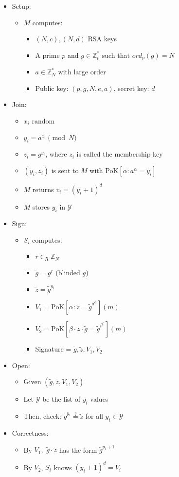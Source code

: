 \documentclass[11pt]{article}
\theoremstyle{definition}
\begin{document}
\begin{itemize}
	\item Setup:
	\begin{itemize}
		\item $M$ computes:
		\begin{itemize}
			\item $(N, c), (N, d)$ RSA keys
			\item A prime $p$ and $g \in \mathbb{Z}_p^*$ such that $ord_p(g) = N$
			\item $a \in \mathbb{Z}_N^*$ with large order
			\item Public key: $(p, g, N, e, a)$, secret key: $d$
		\end{itemize}
	\end{itemize}
	\item Join:
	\begin{itemize}
		\item $x_i$ random
		\item $y_i = a^{x_i} \pmod{N}$
		\item $z_i = g^{y_i}$, where $z_i$ is called the membership key
		\item $(y_i, z_i)$ is sent to $M$ with PoK$[\alpha: a^\alpha = y_i]$
		\item $M$ returns $v_i = (y_i + 1)^d$
		\item $M$ stores $y_i$ in $\mathcal{Y}$
	\end{itemize}
	\item Sign:
	\begin{itemize}
		\item $S_i$ computes:
		\begin{itemize}
			\item $r \in_R \mathbb{Z}_N$
			\item $\tilde{g} = g^r$ (blinded $g$)
			\item $\tilde{z} = \tilde{g}^{y_i}$
			\item $V_1 = \text{PoK}[\alpha: \tilde{z} = \tilde{g}^{a^\alpha}](m)$
			\item $V_2 = \text{PoK}[\beta \cdot \tilde{z} \cdot \tilde{g} = \tilde{g}^{\beta^e}](m)$
			\item Signature = $\tilde{g}, \tilde{z}, V_1, V_2$
		\end{itemize}
	\end{itemize}
	\item Open:
	\begin{itemize}
		\item Given $(\tilde{g}, \tilde{z}, V_1, V_2)$
		\item Let $\mathcal{Y}$ be the list of $y_i$ values
		\item Then, check: $\tilde{g}^{y_i} \stackrel{?}{=} \tilde{z}$ for all $y_i \in \mathcal{Y}$
	\end{itemize}
	\item Correctness:
	\begin{itemize}
		\item By $V_1,$ $\tilde{g} \cdot \tilde{z}$ has the form $\tilde{g}^{y_i + 1}$
		\item By $V_2$, $S_i$ knows $(y_i + 1)^d = V_i$
	\end{itemize}
\end{itemize}
\end{document}
